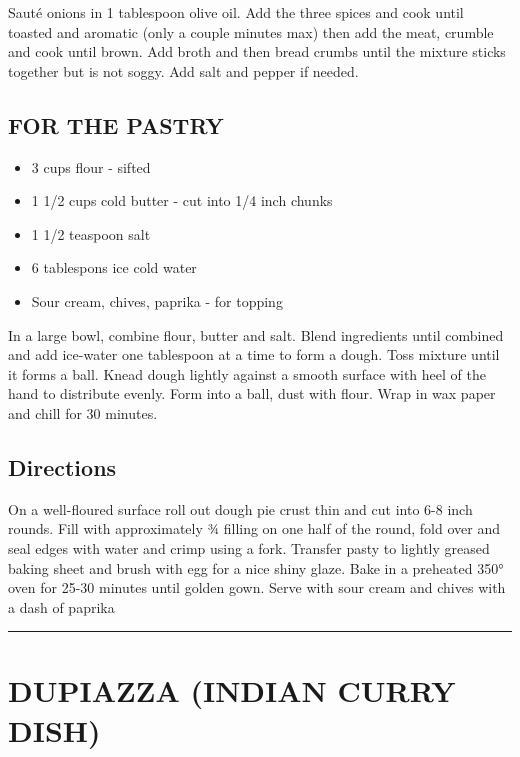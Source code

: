 \documentclass[
]{book}
\providecommand{\tightlist}{%
  \setlength{\itemsep}{0pt}\setlength{\parskip}{0pt}}
\begin{document}
Sauté onions in 1 tablespoon olive oil. Add the three spices and cook until toasted and aromatic
(only a couple minutes max) then add the meat, crumble and cook until brown. Add broth and then
bread crumbs until the mixture sticks together but is not soggy. Add salt and pepper if needed.

\hypertarget{for-the-pastry}{%
\subsection*{FOR THE PASTRY}\label{for-the-pastry}}


\begin{itemize}
\tightlist
\item
  3 cups flour - sifted
\item
  1 1/2 cups cold butter - cut into 1/4 inch chunks
\item
  1 1/2 teaspoon salt
\item
  6 tablespons ice cold water
\item
  Sour cream, chives, paprika - for topping
\end{itemize}

In a large bowl, combine flour, butter and salt. Blend ingredients until combined and add ice-water
one tablespoon at a time to form a dough. Toss mixture until it forms a ball. Knead dough lightly
against a smooth surface with heel of the hand to distribute evenly. Form into a ball, dust with flour.
Wrap in wax paper and chill for 30 minutes.

\hypertarget{directions-53}{%
\subsection*{Directions}\label{directions-53}}


On a well-floured surface roll out dough pie crust thin and cut into 6-8 inch rounds.
Fill with approximately ¾ filling on one half of the round, fold over and seal edges with water
and crimp using a fork. Transfer pasty to lightly greased baking sheet and brush with egg for a
nice shiny glaze. Bake in a preheated 350° oven for 25-30 minutes until golden gown.
Serve with sour cream and chives with a dash of paprika

\begin{center}\rule{0.5\linewidth}{0.5pt}\end{center}

\hypertarget{dupiazza-indian-curry-dish}{%
\section*{DUPIAZZA (INDIAN CURRY DISH)}\label{dupiazza-indian-curry-dish}}
\end{document}
